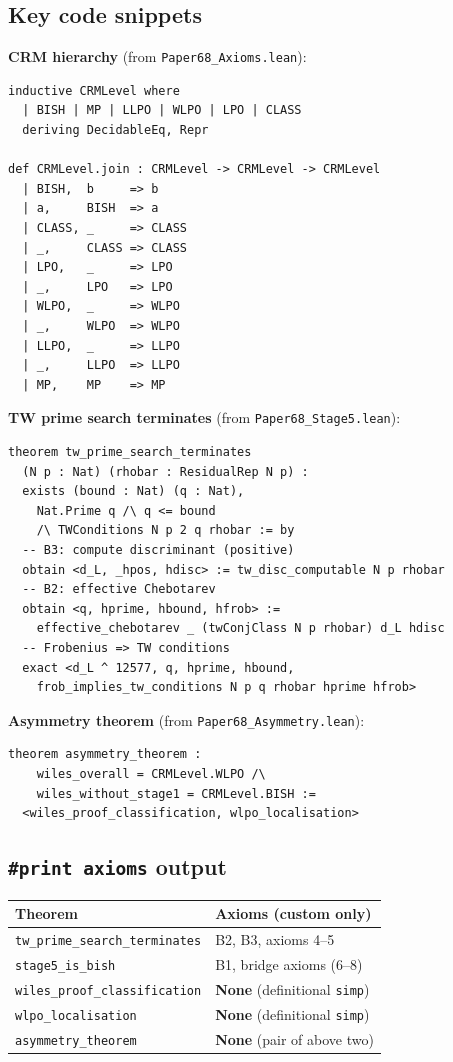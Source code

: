 \documentclass[11pt]{article}
\theoremstyle{plain}
\theoremstyle{definition}
\theoremstyle{remark}
\begin{document}
\subsection{Key code snippets}

\textbf{CRM hierarchy} (from \texttt{Paper68\_Axioms.lean}):

\begin{lstlisting}
inductive CRMLevel where
  | BISH | MP | LLPO | WLPO | LPO | CLASS
  deriving DecidableEq, Repr

def CRMLevel.join : CRMLevel -> CRMLevel -> CRMLevel
  | BISH,  b     => b
  | a,     BISH  => a
  | CLASS, _     => CLASS
  | _,     CLASS => CLASS
  | LPO,   _     => LPO
  | _,     LPO   => LPO
  | WLPO,  _     => WLPO
  | _,     WLPO  => WLPO
  | LLPO,  _     => LLPO
  | _,     LLPO  => LLPO
  | MP,    MP    => MP
\end{lstlisting}

\textbf{TW prime search terminates} (from
\texttt{Paper68\_Stage5.lean}):

\begin{lstlisting}
theorem tw_prime_search_terminates
  (N p : Nat) (rhobar : ResidualRep N p) :
  exists (bound : Nat) (q : Nat),
    Nat.Prime q /\ q <= bound
    /\ TWConditions N p 2 q rhobar := by
  -- B3: compute discriminant (positive)
  obtain <d_L, _hpos, hdisc> := tw_disc_computable N p rhobar
  -- B2: effective Chebotarev
  obtain <q, hprime, hbound, hfrob> :=
    effective_chebotarev _ (twConjClass N p rhobar) d_L hdisc
  -- Frobenius => TW conditions
  exact <d_L ^ 12577, q, hprime, hbound,
    frob_implies_tw_conditions N p q rhobar hprime hfrob>
\end{lstlisting}

\textbf{Asymmetry theorem} (from
\texttt{Paper68\_Asymmetry.lean}):

\begin{lstlisting}
theorem asymmetry_theorem :
    wiles_overall = CRMLevel.WLPO /\
    wiles_without_stage1 = CRMLevel.BISH :=
  <wiles_proof_classification, wlpo_localisation>
\end{lstlisting}

\subsection{\texttt{\#print axioms} output}

\begin{center}
\small
\begin{tabular}{ll}
\toprule
\textbf{Theorem} & \textbf{Axioms (custom only)} \\
\midrule
\texttt{tw\_prime\_search\_terminates} &
  B2, B3, axioms 4--5 \\
\texttt{stage5\_is\_bish} &
  B1, bridge axioms (6--8) \\
\texttt{wiles\_proof\_classification} &
  \textbf{None} (definitional \texttt{simp}) \\
\texttt{wlpo\_localisation} &
  \textbf{None} (definitional \texttt{simp}) \\
\texttt{asymmetry\_theorem} &
  \textbf{None} (pair of above two) \\
\bottomrule
\end{tabular}
\end{center}
\end{document}
